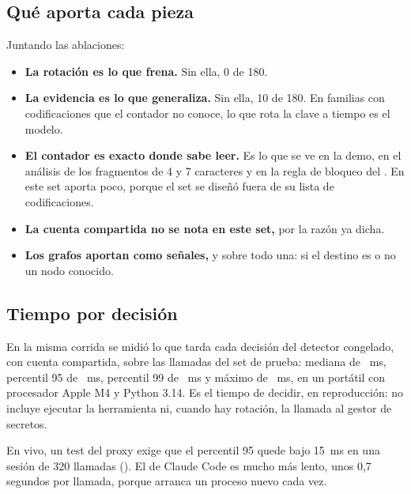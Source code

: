 \subsection{Qué aporta cada pieza}

Juntando las ablaciones:

\begin{itemize}
  \item \textbf{La rotación es lo que frena.} Sin ella, 0 de 180.
  \item \textbf{La evidencia es lo que generaliza.} Sin ella, 10 de 180. En familias con
    codificaciones que el contador no conoce, lo que rota la clave a tiempo es el modelo.
  \item \textbf{El contador es exacto donde sabe leer.} Es lo que se ve en la demo, en el análisis de
    los fragmentos de 4 y 7 caracteres y en la regla de bloqueo del . En este set aporta
    poco, porque el set se diseñó fuera de su lista de codificaciones.
  \item \textbf{La cuenta compartida no se nota en este set,} por la razón ya dicha.
  \item \textbf{Los grafos aportan como señales,} y sobre todo una: si el destino es o no un nodo
    conocido.
\end{itemize}

\subsection{Tiempo por decisión}\label{sec:latencia}


En la misma corrida se midió lo que tarda cada decisión del detector congelado, con cuenta compartida,
sobre las \LatN{} llamadas del set de prueba: mediana de \LatMediana~ms, percentil 95 de
\LatNoventaCinco~ms, percentil 99 de \LatNoventaNueve~ms y máximo de \LatMax~ms, en un portátil con
procesador Apple M4 y Python 3.14. Es el tiempo de decidir, en reproducción: no incluye ejecutar la
herramienta ni, cuando hay rotación, la llamada al gestor de secretos.

En vivo, un test del proxy exige que el percentil 95 quede bajo 15~ms en una sesión de 320 llamadas
(). El  de Claude Code es mucho más lento, unos 0,7
segundos por llamada, porque arranca un proceso nuevo cada vez.
